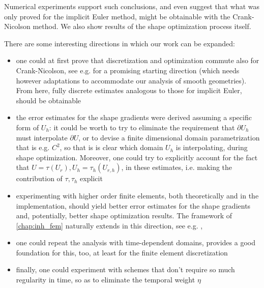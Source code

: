 \documentclass[english,a4paper,9pt,oneside]{scrbook}	%
\theoremstyle{break}
\theoremstyle{remark}
\begin{document}
Numerical experiments support such conclusions, and even suggest that what was only proved for the implicit Euler method, might be obtainable with the Crank-Nicolson method. We also show results of the shape optimization process itself.

There are some interesting directions in which our work can be expanded:

\begin{itemize}
	\item one could at first prove that discretization and optimization commute also for Crank-Nicolson, see e.g. \cite{flaig} for a promising starting direction (which needs however adaptations to accommodate our analysis of smooth geometries). From here, fully discrete estimates analogous to those for implicit Euler, should be obtainable
	\item the error estimates for the shape gradients were derived assuming a specific form of $U_h$: it could be worth to try to eliminate the requirement that $\partial U_h$ must interpolate $\partial U$, or to devise a finite dimensional domain parametrization that is e.g. $C^2$, so that is is clear which domain $U_h$ is interpolating, during shape optimization. Moreover, one could try to explicitly account for the fact that $U=\tau (U_r), U_h = \tau_h(U_{r,h})$, in these estimates, i.e. making the contribution of $\tau, \tau_h$ explicit
	\item experimenting with higher order finite elements, both theoretically and in the implementation, should yield better error estimates for the shape gradients and, potentially, better shape optimization results. The framework of \cref{chap:inh_fem} naturally extends in this direction, see e.g. \cite{ranner}, \cite{elliott}
	\item one could repeat the analysis with time-dependent domains, \cite{ranner} provides a good foundation for this, too, at least for the finite element discretization
	\item finally, one could experiment with schemes that don't require so much regularity in time, so as to eliminate the temporal weight $\eta$
\end{itemize}
\end{document}
